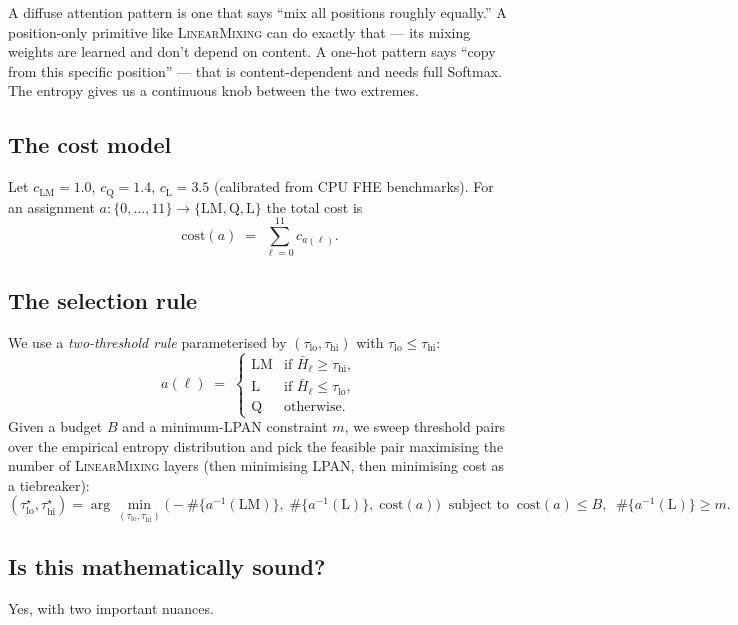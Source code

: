 \documentclass[11pt,a4paper]{article}
\newcommand{\LM}{\textsc{LinearMixing}}
\newcommand{\LPAN}{\textsc{LPAN}}
\begin{document}
\begin{intuition}
A diffuse attention pattern is one that says ``mix all positions
roughly equally.'' A position-only primitive like \LM{} can do
exactly that — its mixing weights are learned and don't depend on
content. A one-hot pattern says ``copy from this specific position''
— that is content-dependent and needs full Softmax. The entropy
gives us a continuous knob between the two extremes.
\end{intuition}

\subsection{The cost model}
Let $c_{\text{LM}} = 1.0$, $c_{\text{Q}} = 1.4$, $c_{\text{L}} = 3.5$
(calibrated from CPU FHE benchmarks). For an assignment
$a:\{0,\dots,11\}\to\{\text{LM},\text{Q},\text{L}\}$ the total cost is
\[
\mathrm{cost}(a) \;=\; \sum_{\ell=0}^{11} c_{a(\ell)}.
\]

\subsection{The selection rule}
We use a \emph{two-threshold rule} parameterised by
$(\tau_{\text{lo}}, \tau_{\text{hi}})$ with $\tau_{\text{lo}} \le \tau_{\text{hi}}$:
\[
a(\ell) \;=\;
\begin{cases}
\text{LM} & \text{if } \bar H_\ell \ge \tau_{\text{hi}}, \\
\text{L}  & \text{if } \bar H_\ell \le \tau_{\text{lo}}, \\
\text{Q}  & \text{otherwise}.
\end{cases}
\]
Given a budget $B$ and a minimum-LPAN constraint $m$, we sweep
threshold pairs over the empirical entropy distribution and pick the
feasible pair maximising the number of \LM{} layers (then minimising
\LPAN{}, then minimising cost as a tiebreaker):
\[
(\tau_{\text{lo}}^\star, \tau_{\text{hi}}^\star)
= \arg\min_{(\tau_{\text{lo}}, \tau_{\text{hi}})}
  \bigl(-\#\{a^{-1}(\text{LM})\},\;
        \#\{a^{-1}(\text{L})\},\;
        \mathrm{cost}(a)\bigr)
\;\;\text{subject to}\;\;
\mathrm{cost}(a) \le B,\;\;
\#\{a^{-1}(\text{L})\} \ge m.
\]

\subsection{Is this mathematically sound?}
Yes, with two important nuances.
\end{document}
